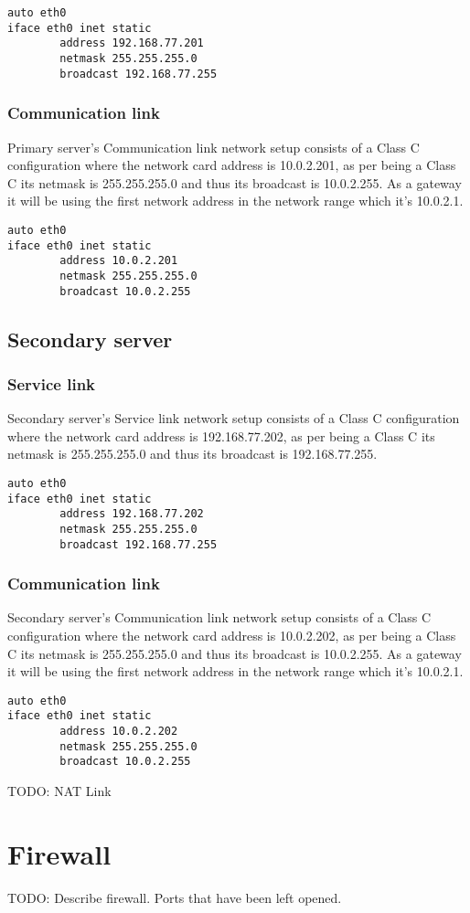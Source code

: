 \begin{verbatim}
auto eth0
iface eth0 inet static
        address 192.168.77.201
        netmask 255.255.255.0
        broadcast 192.168.77.255
\end{verbatim}

\subsubsection {Communication link}
Primary server's Communication link network setup consists of a Class C configuration where the network card address is 10.0.2.201, as per being a Class C its netmask is 255.255.255.0 and thus its broadcast is 10.0.2.255. As a gateway it will be using the first network address in the network range which it's 10.0.2.1.

\begin{verbatim}
auto eth0
iface eth0 inet static
        address 10.0.2.201
        netmask 255.255.255.0
        broadcast 10.0.2.255
\end{verbatim}
\subsection {Secondary server}
\subsubsection {Service link}
Secondary server's Service link network setup consists of a Class C configuration where the network card address is 192.168.77.202, as per being a Class C its netmask is 255.255.255.0 and thus its broadcast is 192.168.77.255.

\begin{verbatim}
auto eth0
iface eth0 inet static
        address 192.168.77.202
        netmask 255.255.255.0
        broadcast 192.168.77.255
\end{verbatim}

\subsubsection {Communication link}
Secondary server's Communication link network setup consists of a Class C configuration where the network card address is 10.0.2.202, as per being a Class C its netmask is 255.255.255.0 and thus its broadcast is 10.0.2.255. As a gateway it will be using the first network address in the network range which it's 10.0.2.1.

\begin{verbatim}
auto eth0
iface eth0 inet static
        address 10.0.2.202
        netmask 255.255.255.0
        broadcast 10.0.2.255
\end{verbatim}

TODO: NAT Link

\section {Firewall}

TODO: Describe firewall. Ports that have been left opened.


